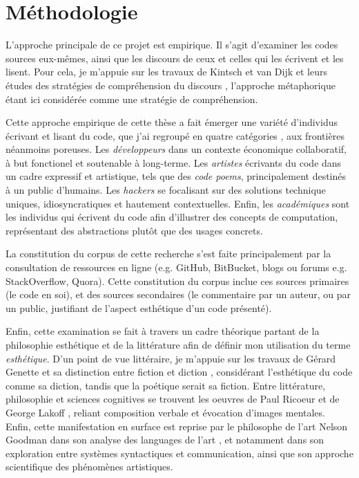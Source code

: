 \documentclass{article}
\begin{document}
\section{Méthodologie}

L'approche principale de ce projet est empirique. Il s'agit d'examiner les codes sources eux-mêmes, ainsi que les discours de ceux et celles qui les écrivent et les lisent. Pour cela, je m'appuie sur les travaux de Kintsch et van Dijk et leurs études des stratégies de compréhension du discours \citep{kintsch_model_1978}, l'approche métaphorique étant ici considérée comme une stratégie de compréhension.

Cette approche empirique de cette thèse a fait émerger une variété d'individus écrivant et lisant du code, que j'ai regroupé en quatre catégories \citep{hayes_cultures_2017}, aux frontières néanmoins poreuses. Les \emph{développeurs} dans un contexte économique collaboratif, à but fonctionel et soutenable à long-terme. Les \emph{artistes} écrivants du code dans un cadre expressif et artistique, tels que des \emph{code poems}, principalement destinés à un public d'humains. Les \emph{hackers} se focalisant sur des solutions technique uniques, idiosyncratiques et hautement contextuelles. Enfin, les \emph{académiques} sont les individus qui écrivent du code afin d'illustrer des concepts de computation, représentant des abstractions plutôt que des usages concrets.

La constitution du corpus de cette recherche s'est faite principalement par la consultation de ressources en ligne (e.g. GitHub, BitBucket, blogs ou forums e.g. StackOverflow, Quora). Cette constitution du corpus inclue ces sources primaires (le code en soi), et des sources secondaires (le commentaire par un auteur, ou par un public, justifiant de l'aspect esthétique d'un code présenté).

Enfin, cette examination se fait à travers un cadre théorique partant de la philosophie esthétique et de la littérature afin de définir mon utilisation du terme \emph{esthétique}. D'un point de vue littéraire, je m'appuie sur les travaux de Gérard Genette et sa distinction entre fiction et diction \citep{genette_fiction_1993}, considérant l'esthétique du code comme sa diction, tandis que la poétique serait sa fiction. Entre littérature, philosophie et sciences cognitives se trouvent les oeuvres de Paul Ricoeur \citep{ricoeur_rule_2003} et de George Lakoff \citep{lakoff_metaphors_1980}, reliant composition verbale et évocation d'images mentales. Enfin, cette manifestation en surface est reprise par le philosophe de l'art Nelson Goodman dans son analyse des languages de l'art \citep{goodman_languages_1976}, et notamment dans son exploration entre systèmes syntactiques et communication, ainsi que son approche scientifique des phénomènes artistiques.
\end{document}
